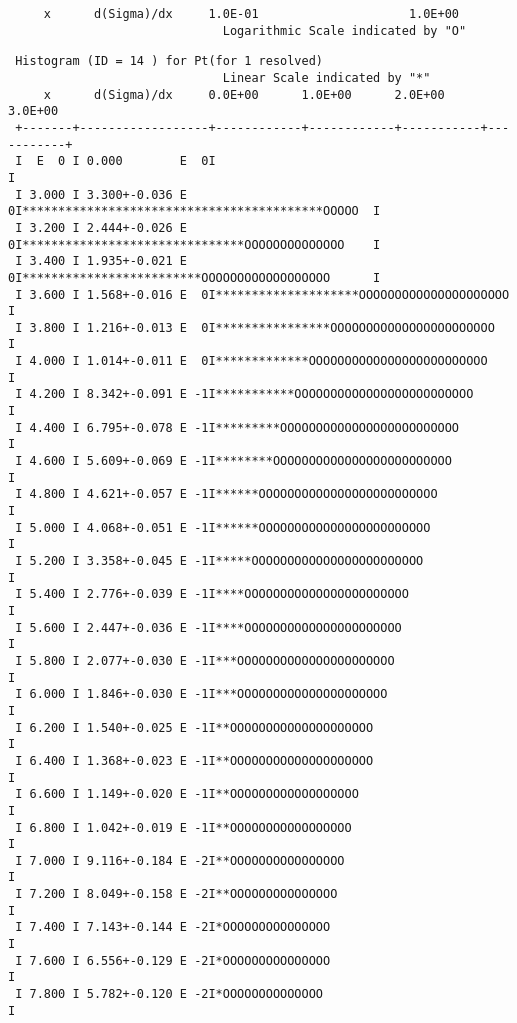 \begin{small}
\begin{verbatim}
     x      d(Sigma)/dx     1.0E-01                     1.0E+00                
                              Logarithmic Scale indicated by "O"
\end{verbatim}
\newpage
\begin{verbatim}  
 Histogram (ID = 14 ) for Pt(for 1 resolved)                                              
                              Linear Scale indicated by "*"
     x      d(Sigma)/dx     0.0E+00      1.0E+00      2.0E+00     3.0E+00      
 +-------+------------------+------------+------------+-----------+-----------+
 I  E  0 I 0.000        E  0I                                                 I
 I 3.000 I 3.300+-0.036 E  0I******************************************OOOOO  I
 I 3.200 I 2.444+-0.026 E  0I*******************************OOOOOOOOOOOOOO    I
 I 3.400 I 1.935+-0.021 E  0I*************************OOOOOOOOOOOOOOOOOO      I
 I 3.600 I 1.568+-0.016 E  0I********************OOOOOOOOOOOOOOOOOOOOO        I
 I 3.800 I 1.216+-0.013 E  0I****************OOOOOOOOOOOOOOOOOOOOOOO          I
 I 4.000 I 1.014+-0.011 E  0I*************OOOOOOOOOOOOOOOOOOOOOOOOO           I
 I 4.200 I 8.342+-0.091 E -1I***********OOOOOOOOOOOOOOOOOOOOOOOOO             I
 I 4.400 I 6.795+-0.078 E -1I*********OOOOOOOOOOOOOOOOOOOOOOOOO               I
 I 4.600 I 5.609+-0.069 E -1I********OOOOOOOOOOOOOOOOOOOOOOOOO                I
 I 4.800 I 4.621+-0.057 E -1I******OOOOOOOOOOOOOOOOOOOOOOOOO                  I
 I 5.000 I 4.068+-0.051 E -1I******OOOOOOOOOOOOOOOOOOOOOOOO                   I
 I 5.200 I 3.358+-0.045 E -1I*****OOOOOOOOOOOOOOOOOOOOOOOO                    I
 I 5.400 I 2.776+-0.039 E -1I****OOOOOOOOOOOOOOOOOOOOOOO                      I
 I 5.600 I 2.447+-0.036 E -1I****OOOOOOOOOOOOOOOOOOOOOO                       I
 I 5.800 I 2.077+-0.030 E -1I***OOOOOOOOOOOOOOOOOOOOOO                        I
 I 6.000 I 1.846+-0.030 E -1I***OOOOOOOOOOOOOOOOOOOOO                         I
 I 6.200 I 1.540+-0.025 E -1I**OOOOOOOOOOOOOOOOOOOO                           I
 I 6.400 I 1.368+-0.023 E -1I**OOOOOOOOOOOOOOOOOOOO                           I
 I 6.600 I 1.149+-0.020 E -1I**OOOOOOOOOOOOOOOOOO                             I
 I 6.800 I 1.042+-0.019 E -1I**OOOOOOOOOOOOOOOOO                              I
 I 7.000 I 9.116+-0.184 E -2I**OOOOOOOOOOOOOOOO                               I
 I 7.200 I 8.049+-0.158 E -2I**OOOOOOOOOOOOOOO                                I
 I 7.400 I 7.143+-0.144 E -2I*OOOOOOOOOOOOOOO                                 I
 I 7.600 I 6.556+-0.129 E -2I*OOOOOOOOOOOOOOO                                 I
 I 7.800 I 5.782+-0.120 E -2I*OOOOOOOOOOOOOO                                  I

\end{verbatim}
\end{small}
